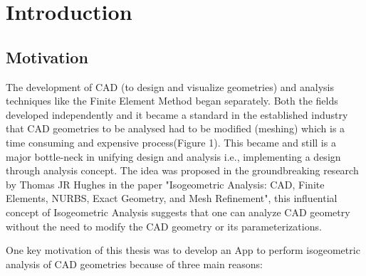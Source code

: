 \documentclass[12pt, a4paper]{report}
\begin{document}
\tableofcontents
\newpage
{}

\chapter{Introduction} \label{chap: intro}

\section{Motivation}
 The development of CAD (to design and visualize geometries) and analysis techniques like the Finite Element Method began separately. Both the fields developed independently and it became a standard in the established industry that CAD geometries to be analysed had to be modified (meshing) which is a time consuming and expensive process(Figure 1). This became and still is  a major bottle-neck in unifying design and analysis i.e., implementing a design through analysis concept. The idea was proposed in the groundbreaking research by Thomas JR Hughes in the paper "Isogeometric Analysis: CAD, Finite Elements, NURBS, Exact Geometry, and Mesh Refinement"\cite{HUGHES20054135}, this influential concept of Isogeometric Analysis suggests that one can analyze CAD geometry without the need to modify the CAD geometry or its parameterizations. \par
 One key motivation of this thesis was to develop an App to perform isogeometric analysis of CAD geometries because of three main reasons:
\end{document}
